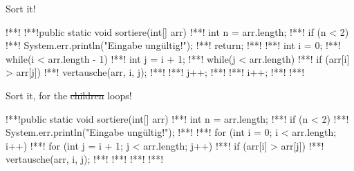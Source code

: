 {\begin{frame}[fragile,c]{Sort it!}
\begin{plainjava}
!**!
!**!public static void sortiere(int[] arr) {
!**!    int n = arr.length;
!**!    if (n < 2) {
!**!        System.err.println("Eingabe ungültig!");
!**!        return;
!**!    }
!**!    int i = 0;
!**!    while(i < arr.length - 1) {
!**!        int j = i + 1;
!**!        while(j < arr.length) {
!**!            if (arr[i] > arr[j]) {
!**!                vertausche(arr, i, j);
!**!            }
!**!            j++;
!**!        }
!**!        i++;
!**!    }
!**!}
\end{plainjava}
\end{frame}

\iffull
{
    \AddonFrame
    \begin{frame}{Sort it, for the \sout{children} loops!}
\begin{plainjava}
!**!public static void sortiere(int[] arr) {
!**!    int n = arr.length;
!**!    if (n < 2) {
!**!        System.err.println("Eingabe ungültig!");
!**!    }
!**!    for (int i = 0; i < arr.length; i++) {
!**!        for (int j = i + 1; j < arr.length; j++) {
!**!            if (arr[i] > arr[j]) {
!**!                vertausche(arr, i, j);
!**!            }
!**!        }
!**!    }
!**!}
\end{plainjava}
    \end{frame}
}
\fi

}
